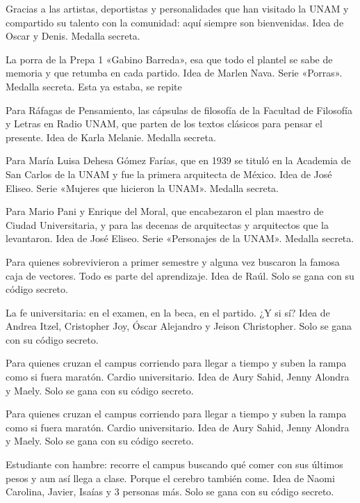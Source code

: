 \begin{description}[leftmargin=1.4cm, style=nextline]
  \item[F4M0S0S] Gracias a las artistas, deportistas y personalidades que han visitado la UNAM y compartido su talento con la comunidad: aquí siempre son bienvenidas. Idea de Oscar y Denis. Medalla secreta.
  \item[G4B1N0] La porra de la Prepa 1 «Gabino Barreda», esa que todo el plantel se sabe de memoria y que retumba en cada partido. Idea de Marlen Nava. Serie «Porras». Medalla secreta. Esta ya estaba, se repite
  \item[R4F4G4S] Para Ráfagas de Pensamiento, las cápsulas de filosofía de la Facultad de Filosofía y Letras en Radio UNAM, que parten de los textos clásicos para pensar el presente. Idea de Karla Melanie. Medalla secreta.
  \item[D3H3S4] Para María Luisa Dehesa Gómez Farías, que en 1939 se tituló en la Academia de San Carlos de la UNAM y fue la primera arquitecta de México. Idea de José Eliseo. Serie «Mujeres que hicieron la UNAM». Medalla secreta.
  \item[P4N1M0R4L] Para Mario Pani y Enrique del Moral, que encabezaron el plan maestro de Ciudad Universitaria, y para las decenas de arquitectas y arquitectos que la levantaron. Idea de José Eliseo. Serie «Personajes de la UNAM». Medalla secreta.
  \item[V3CT0R3S] Para quienes sobrevivieron a primer semestre y alguna vez buscaron la famosa caja de vectores. Todo es parte del aprendizaje. Idea de Raúl. Solo se gana con su código secreto.
  \item[YS1S1] La fe universitaria: en el examen, en la beca, en el partido. ¿Y si sí? Idea de Andrea Itzel, Cristopher Joy, Óscar Alejandro y Jeison Christopher. Solo se gana con su código secreto.
  \item[T4RD3CORR] Para quienes cruzan el campus corriendo para llegar a tiempo y suben la rampa como si fuera maratón. Cardio universitario. Idea de Aury Sahid, Jenny Alondra y Maely. Solo se gana con su código secreto.
  \item[T4RD3C0RR] Para quienes cruzan el campus corriendo para llegar a tiempo y suben la rampa como si fuera maratón. Cardio universitario. Idea de Aury Sahid, Jenny Alondra y Maely. Solo se gana con su código secreto.
  \item[3STUD1H4M] Estudiante con hambre: recorre el campus buscando qué comer con sus últimos pesos y aun así llega a clase. Porque el cerebro también come. Idea de Naomi Carolina, Javier, Isaías y 3 personas más. Solo se gana con su código secreto.

\end{description}

